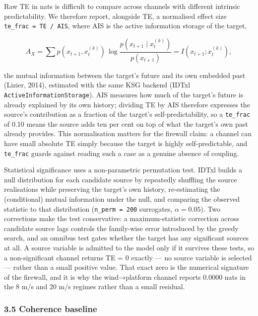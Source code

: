\documentclass[
  english,
  11pt,
]{article}
\begin{document}
Raw TE in nats is difficult to compare across channels with different
intrinsic predictability. We therefore report, alongside TE, a
normalised effect size \texttt{te\_frac\ =\ TE\ /\ AIS}, where AIS is
the active information storage of the target,

\[
A_X = \sum p\!\left(x_{t+1}, x_t^{(k)}\right)\, \log \frac{p\!\left(x_{t+1} \mid x_t^{(k)}\right)}{p\!\left(x_{t+1}\right)} = I\!\left(x_{t+1}; x_t^{(k)}\right),
\]

the mutual information between the target's future and its own embedded
past (Lizier, 2014), estimated with the same KSG backend (IDTxl
\texttt{ActiveInformationStorage}). AIS measures how much of the
target's future is already explained by its own history; dividing TE by
AIS therefore expresses the source's contribution as a fraction of the
target's self-predictability, so a \texttt{te\_frac} of 0.10 means the
source adds ten per cent on top of what the target's own past already
provides. This normalisation matters for the firewall claim: a channel
can have small absolute TE simply because the target is highly
self-predictable, and \texttt{te\_frac} guards against reading such a
case as a genuine absence of coupling.

Statistical significance uses a non-parametric permutation test. IDTxl
builds a null distribution for each candidate source by repeatedly
shuffling the source realisations while preserving the target's own
history, re-estimating the (conditional) mutual information under the
null, and comparing the observed statistic to that distribution
(\texttt{n\_perm\ =\ 200} surrogates, \(\alpha = 0.05\)). Two
corrections make the test conservative: a maximum-statistic correction
across candidate source lags controls the family-wise error introduced
by the greedy search, and an omnibus test gates whether the target has
any significant sources at all. A source variable is admitted to the
model only if it survives these tests, so a non-significant channel
returns TE = 0 exactly --- no source variable is selected --- rather
than a small positive value. That exact zero is the numerical signature
of the firewall, and it is why the wind→platform channel reports 0.0000
nats in the 8 m/s and 20 m/s regimes rather than a small residual.

\subsubsection{3.5 Coherence baseline}\label{coherence-baseline}
\end{document}
